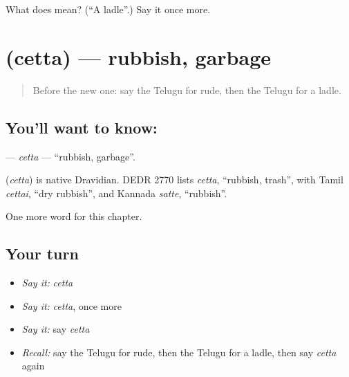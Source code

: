 \begin{tcolorbox}[breakable,colback=teal!4,colframe=teal!35!black,title={Before you move on}]
What does  mean? (\textquotedblleft{}A ladle\textquotedblright{}.) Say it once more.
\end{tcolorbox}
\section[\texorpdfstring{\te{చెత్త} (cetta)}{చెత్త (cetta)}]{ (cetta) — rubbish, garbage}

\label{lesson:TE-C224-cetta}



\begin{quote}
Before the new one: say the Telugu for rude, then the Telugu for a ladle.
\end{quote}

\subsection*{You'll want to know: }
\textbf{} — \emph{cetta} — \textquotedblleft{}rubbish, garbage\textquotedblright{}.

\begin{cousinweb}
\textbf{} (\emph{cetta}) is native Dravidian. DEDR 2770 lists \emph{cetta}, \textquotedblleft{}rubbish, trash\textquotedblright{}, with Tamil \emph{cettai}, \textquotedblleft{}dry rubbish\textquotedblright{}, and Kannada \emph{satte}, \textquotedblleft{}rubbish\textquotedblright{}.
\end{cousinweb}

\begin{grammarlens}[title={What you've built}]
One more word for this chapter.
\end{grammarlens}

\subsection*{Your turn}
\begin{itemize}
\raggedright
  \item \emph{Say it:} \emph{cetta}
  \item \emph{Say it:} \emph{cetta}, once more
  \item \emph{Say it:} say \emph{cetta}
  \item \emph{Recall:} say the Telugu for rude, then the Telugu for a ladle, then say \emph{cetta} again
\end{itemize}

